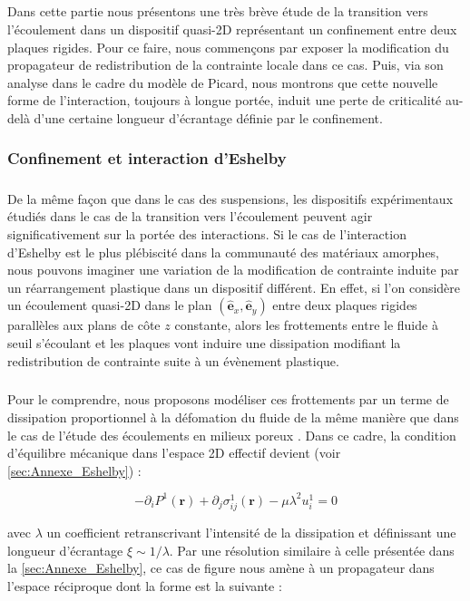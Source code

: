 \label{sec:lambda_picard}

\subparagraph{}Dans cette partie nous présentons une très brève étude de la transition vers l'écoulement dans un dispositif quasi-2D représentant un confinement entre deux plaques rigides. Pour ce faire, nous commençons par exposer la modification du propagateur de redistribution de la contrainte locale dans ce cas. Puis, via son analyse dans le cadre du modèle de Picard, nous montrons que cette nouvelle forme de l'interaction, toujours à longue portée, induit une perte de criticalité au-delà d'une certaine longueur d'écrantage définie par le confinement.

\subsubsection{Confinement et interaction d'Eshelby}

\subparagraph{}De la même façon que dans le cas des suspensions, les dispositifs expérimentaux étudiés dans le cas de la transition vers l'écoulement peuvent agir significativement sur la portée des interactions. Si le cas de l'interaction d'Eshelby est le plus plébiscité dans la communauté des matériaux amorphes, nous pouvons imaginer une variation de la modification de contrainte induite par un réarrangement plastique dans un dispositif différent. En effet, si l'on considère un écoulement quasi-2D dans le plan $(\hat{\mathbf{e}}_x, \hat{\mathbf{e}}_y)$ entre deux plaques rigides parallèles aux plans de côte $z$ constante, alors les frottements entre le fluide à seuil s'écoulant et les plaques vont induire une dissipation modifiant la redistribution de contrainte suite à un évènement plastique. 

\subparagraph{}Pour le comprendre, nous proposons modéliser ces frottements par un terme de dissipation proportionnel à la défomation du fluide de la même manière que dans le cas de l'étude des écoulements en milieux poreux \cite{long_note_2001}. Dans ce cadre, la condition d'équilibre mécanique dans l'espace 2D effectif devient (voir \autoref{sec:Annexe_Eshelby}) :

\begin{equation}
	-\partial_i P^1(\mathbf{r}) + \partial_j\sigma_{ij}^1(\mathbf{r}) - \mu\lambda^2 u^1_{i}= 0
\end{equation}

\noindent avec $\lambda$ un coefficient retranscrivant l'intensité de la dissipation et définissant une longueur d'écrantage $\xi \sim 1/\lambda$. Par une résolution similaire à celle présentée dans la \autoref{sec:Annexe_Eshelby}, ce cas de figure nous amène à un propagateur dans l'espace réciproque dont la forme est la suivante :

